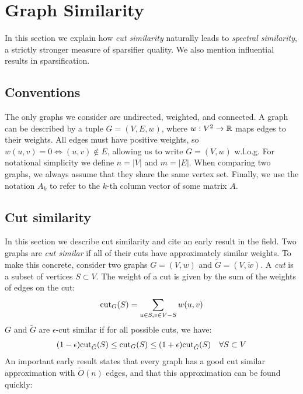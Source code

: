 \documentclass{article}
\begin{document}
\section{Graph Similarity}

In this section we explain how \textit{cut similarity} naturally leads to
\textit{spectral similarity}, a strictly stronger measure of sparsifier
quality. We also mention influential results in sparsification.

\subsection{Conventions}

The only graphs we consider are undirected, weighted, and connected. A graph
can be described by a tuple $G = (V, E, w)$, where $w : V^2 \rightarrow \mathbb{R}$
maps edges to their weights. All edges must have positive weights, so $w(u,
v) = 0 \Leftrightarrow (u, v) \not\in E$, allowing us to write $G = (V, w)$
w.l.o.g. For notational simplicity we define $n = |V|$ and $m = |E|$. When
comparing two graphs, we always assume that they share the same vertex set.
Finally, we use the notation $A_k$ to refer to the $k$-th column vector of
some matrix $A$. 

\subsection{Cut similarity}

In this section we describe cut similarity and cite an early result in the
field. Two graphs are \textit{cut similar} if all of their cuts have
approximately similar weights. To make this concrete, consider two graphs $G
= (V, w)$ and $\tilde{G} = (V, \tilde{w})$. A \textit{cut} is a subset of
vertices $S \subset V$.  The weight of a cut is given by the sum of the
weights of edges on the cut:
\begin{align*}
    \text{cut}_{G}(S) = \sum_{u \in S, v \in V - S} w(u, v)
\end{align*}
$G$ and $\tilde{G}$ are $\epsilon$-cut similar if for all possible cuts, we
have:
\begin{align*}
    (1 - \epsilon)\text{cut}_{\tilde{G}}(S) \leq \text{cut}_{G}(S) \leq (1 +
    \epsilon)\text{cut}_{\tilde{G}}(S) \quad \forall{S \subset V}
\end{align*}
An important early result states that every graph has a good cut similar
approximation with $\tilde{O}(n)$ edges, and that this approximation can be
found quickly: \\
\end{document}
